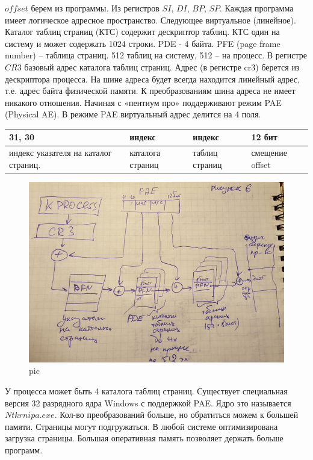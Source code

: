 $offset$ берем из программы. Из регистров $SI$, $DI$, $BP$, $SP$.
Каждая программа имеет логическое адресное пространство. Следующее виртуальное (линейное).
Каталог таблиц страниц (КТС) содержит дескриптор таблиц. КТС один на систему и может содержать 1024 строки.
PDE - 4 байта.
PFE (page frame number) – таблица страниц. 512 таблиц на систему, 512 – на процесс. В регистре $CR3$ базовый адрес каталога таблиц страниц. Адрес (в регистре cr3) берется из дескриптора процесса.
На шине адреса будет всегда находится линейный адрес, т.е. адрес байта физической памяти. К преобразованиям шина адреса не имеет никакого отношения. 
Начиная с «пентиум про» поддерживают режим PAE (Physical AE). 
В режиме PAE виртуальный адрес делится на 4 поля.

\begin{table}[H]
\begin{tabular}{|l|l|l|l|}
\hline
31, 30 & индекс & индекс & 12 бит\\
\hline
индекс указателя на каталог страниц. & каталога страниц & таблиц страниц & смещение offset\\
\hline
\end{tabular}
\end{table}

\begin{figure}[H]
    \centering
    \includegraphics[width=\textwidth]{pic/6.png}
    \caption{pic}
\end{figure}

У процесса может быть 4 каталога таблиц страниц.
Существует специальная версия 32 разрядного ядра Windows с поддержкой PAE. Ядро это называется $Ntkrnipa.exe$. Кол-во преобразований больше, но обратиться можем к большей памяти. Страницы могут подгружаться. В любой системе оптимизирована загрузка страницы. Большая оперативная память позволяет держать больше программ.